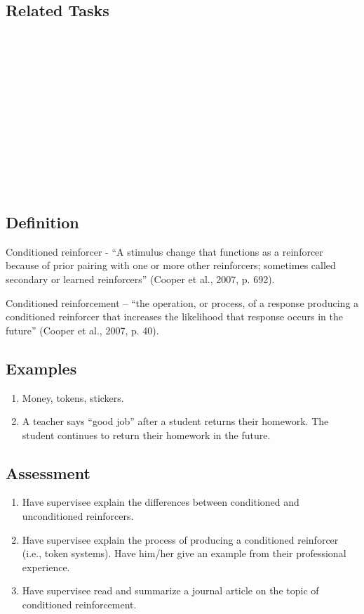 \subsection{Related Tasks}
\fourcOne{}\\
\fourdOne{}\\\
\fourdTwo{}\\\
\fourdNineteen{}\\
\fourFKTwo{}\\
\fourFKThirteen{}\\
\fourFKSixteen{}\\
\fourFKNineteen{}\\
\fourFKTwentyOne{}\\
\fourFKTwentySix{}\\
\fourFKThirty{}\\
%
\clearpage \section{\fourFKEighteen{}}
\subsection{Definition}
Conditioned reinforcer - ``A stimulus change that functions as a reinforcer because of prior pairing with one or more other reinforcers; sometimes called secondary or learned reinforcers'' (Cooper et al., 2007, p. 692). 

Conditioned reinforcement – ``the operation, or process, of a response producing a conditioned reinforcer that increases the likelihood that response occurs in the future'' (Cooper et al., 2007, p. 40).
%
\subsection{Examples}
\begin{enumerate}
\item  Money, tokens, stickers.
\item A teacher says ``good job'' after a student returns their homework. The student continues to return their homework in the future. 
%
\end{enumerate}
%
\subsection{Assessment}
\begin{enumerate}
\item Have supervisee explain the differences between conditioned and unconditioned reinforcers.
\item Have supervisee explain the process of producing a conditioned reinforcer (i.e., token systems). Have him/her give an example from their professional experience.
\item Have supervisee read and summarize a journal article on the topic of conditioned reinforcement. 
\end{enumerate}
%
